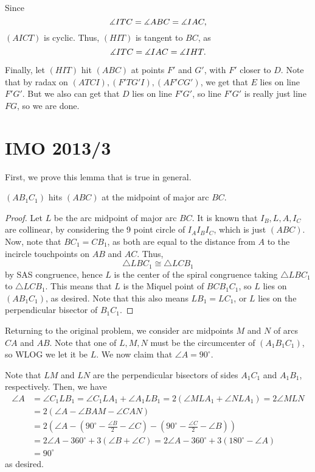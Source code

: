 \documentclass[11pt]{scrartcl}
\begin{document}
Since \[\measuredangle ITC = \measuredangle ABC = \measuredangle IAC,\] $(AICT)$ is cyclic. Thus, $(HIT)$ is tangent to $BC$, as \[\measuredangle ITC = \measuredangle IAC = \measuredangle IHT.\]

Finally, let $(HIT)$ hit $(ABC)$ at points $F'$ and $G'$, with $F'$ closer to $D$. Note that by radax on $(ATCI), (F'TG'I), (AF'CG')$, we get that $E$ lies on line $F'G'$. But we also can get that $D$ lies on line $F'G'$, so line $F'G'$ is really just line $FG$, so we are done.

\section{IMO 2013/3}
First, we prove this lemma that is true in general. 
\begin{lemma}
$(AB_1C_1)$ hits $(ABC)$ at the midpoint of major arc $BC$.
\end{lemma}
\begin{proof}
Let $L$ be the arc midpoint of major arc $BC$. It is known that $I_B, L, A, I_C$ are collinear, by considering the 9 point circle of $I_AI_BI_C$, which is just $(ABC)$. Now, note that $BC_1=CB_1$, as both are equal to the distance from $A$ to the incircle touchpoints on $AB$ and $AC$. Thus, \[\triangle LBC_1 \cong \triangle LCB_1\] by SAS congruence, hence $L$ is the center of the spiral congruence taking $\triangle LBC_1$ to $\triangle LCB_1$. This means that $L$ is the Miquel point of $BCB_1C_1$, so $L$ lies on $(AB_1C_1)$, as desired. Note that this also means $LB_1=LC_1$, or $L$ lies on the perpendicular bisector of $B_1C_1$. 
\end{proof}
Returning to the original problem, we consider arc midpoints $M$ and $N$ of arcs $CA$ and $AB$. Note that one of $L, M, N$ must be the circumcenter of $(A_1B_1C_1)$, so WLOG we let it be $L$. We now claim that $\angle A = 90^\circ$. 

Note that $LM$ and $LN$ are the perpendicular bisectors of sides $A_1C_1$ and $A_1B_1$, respectively. Then, we have
\begin{align*}
\angle A &= \angle C_1LB_1 = \angle C_1LA_1 + \angle A_1LB_1 = 2(\angle MLA_1 + \angle NLA_1) = 2\angle MLN \\
&= 2(\angle A - \angle BAM - \angle CAN) \\
&= 2 \left (\angle A - \left (90^\circ - \frac{\angle B}{2} -\angle C \right) - \left (90^\circ - \frac{\angle C}{2} -\angle B \right) \right) \\
&= 2 \angle A - 360^\circ + 3 (\angle B + \angle C) = 2 \angle A - 360^\circ + 3 (180^\circ - \angle A) \\
&= 90^\circ
\end{align*}
as desired. 
\end{document}
